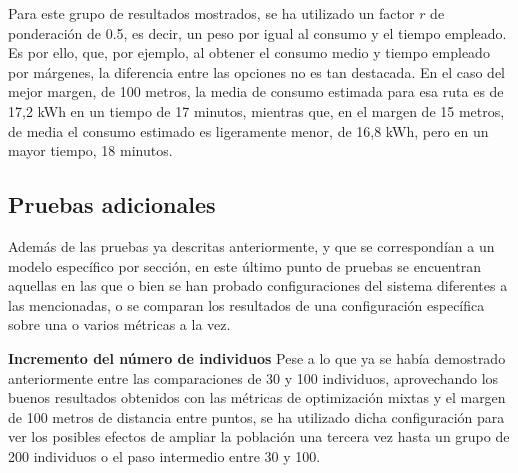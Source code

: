 \documentclass[11pt,spanish,listoffigures,listoftables]{tfgetsinf}
\begin{document}
Para este grupo de resultados mostrados, se ha utilizado un factor $r$ de ponderación de 0.5, es decir, un peso por igual al consumo y el tiempo empleado. Es por ello, que, por ejemplo, al obtener el consumo medio y tiempo empleado por márgenes, la diferencia entre las opciones no es tan destacada. En el caso del mejor margen, de 100 metros, la media de consumo estimada para esa ruta es de 17,2 kWh en un tiempo de 17 minutos, mientras que, en el margen de 15 metros, de media el consumo estimado es ligeramente menor, de 16,8 kWh, pero en un mayor tiempo, 18 minutos.

\newpage
\subsection{Pruebas adicionales}
Además de las pruebas ya descritas anteriormente, y que se correspondían a un modelo específico por sección, en este último punto de pruebas se encuentran aquellas en las que o bien se han probado configuraciones del sistema diferentes a las mencionadas, o se comparan los resultados de una configuración específica sobre una o varios métricas a la vez.\newline

\textbf{Incremento del número de individuos}\newline
Pese a lo que ya se había demostrado anteriormente entre las comparaciones de 30 y 100 individuos, aprovechando los buenos resultados obtenidos con las métricas de optimización mixtas y el margen de 100 metros de distancia entre puntos, se ha utilizado dicha configuración para ver los posibles efectos de ampliar la población una tercera vez hasta un grupo de 200 individuos o el paso intermedio entre 30 y 100.
\end{document}
